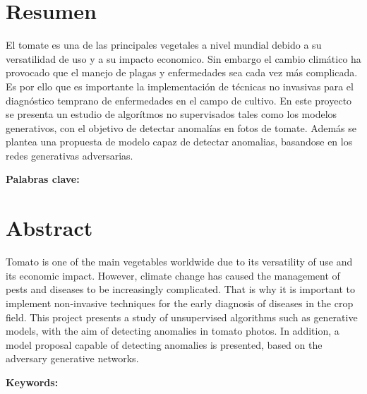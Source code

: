 \chapter*{Resumen}
\thispagestyle{empty}

El tomate es una de las principales vegetales a nivel mundial debido a su versatilidad de uso y a su impacto economico. Sin embargo el cambio climático ha provocado que el manejo de plagas y enfermedades sea cada vez más complicada. Es por ello que es importante la implementación de técnicas no invasivas para el diagnóstico temprano de enfermedades en el campo de cultivo. En este proyecto se presenta un estudio de algorítmos no supervisados tales como los modelos generativos, con el objetivo de detectar anomalías en fotos de tomate. Además se plantea una propuesta de modelo capaz de detectar anomalias, basandose en los redes generativas adversarias.

\bigskip

\textbf{Palabras clave:} \thesisKeywords

\clearpage
\chapter*{Abstract}
\thispagestyle{empty}

Tomato is one of the main vegetables worldwide due to its versatility of use and its economic impact. However, climate change has caused the management of pests and diseases to be increasingly complicated. That is why it is important to implement non-invasive techniques for the early diagnosis of diseases in the crop field. This project presents a study of unsupervised algorithms such as generative models, with the aim of detecting anomalies in tomato photos. In addition, a model proposal capable of detecting anomalies is presented, based on the adversary generative networks.

\bigskip

\textbf{Keywords:} \thesisKeywords 

\cleardoublepage

